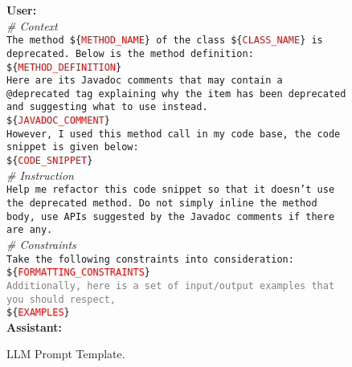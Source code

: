 \documentclass[conference]{IEEEtran}
\newcommand{\templatevar}[1]{\$\{\textcolor{red}{#1}\}}
\begin{document}
\begin{figure}
  \centering
  \begin{tcolorbox}[
    colback=prompt_bg,
    colframe=prompt_title,
    subtitle style={boxrule=0.4pt, colback=yellow!50!blue!25!white, colupper=black}
  ]
  \scriptsize

  \textbf{User:}\\
  \textit{\# Context}\\
  \texttt{The method \templatevar{METHOD\_NAME} of the class \templatevar{CLASS\_NAME} is deprecated. Below is the method definition:}\\
  \texttt{\templatevar{METHOD\_DEFINITION}}\\

  \texttt{Here are its Javadoc comments that may contain a @deprecated tag explaining why the item has been deprecated and suggesting what to use instead.}\\
  \texttt{\templatevar{JAVADOC\_COMMENT}}\\

  \texttt{However, I used this method call in my code base, the code snippet is given below:}\\
  \texttt{\templatevar{CODE\_SNIPPET}}\\

  \textit{\# Instruction}\\
  \texttt{Help me refactor this code snippet so that it doesn't use the deprecated method. Do not simply inline the method body, use APIs suggested by the Javadoc comments if there are any.}\\

  \textit{\# Constraints}\\
  \texttt{Take the following constraints into consideration:}\\
  \texttt{\templatevar{FORMATTING\_CONSTRAINTS}}\\

  \texttt{\textcolor{gray}{Additionally, here is a set of input/output examples that you should respect,}}\\
  \texttt{\templatevar{EXAMPLES}}\\

  \textbf{Assistant:}\\
  \end{tcolorbox}
  \caption{LLM Prompt Template.}
  \label{fig:prompt}
\end{figure}
\end{document}

